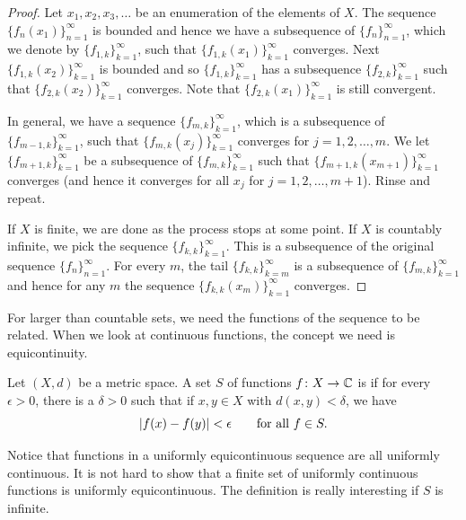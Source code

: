 \begin{proof}
Let $x_1,x_2,x_3,\ldots$ be an enumeration of the elements of $X$.
The sequence $\{ f_n(x_1) \}_{n=1}^\infty$ is bounded and hence
we have a subsequence of $\{ f_n \}_{n=1}^{\infty}$, which we denote by
$\{ f_{1,k} \}_{k=1}^\infty$,
such that
$\{ f_{1,k}(x_1) \}_{k=1}^\infty$ converges.
Next $\{ f_{1,k}(x_2) \}_{k=1}^\infty$ is bounded and so 
$\{ f_{1,k} \}_{k=1}^\infty$ has a subsequence
$\{ f_{2,k} \}_{k=1}^\infty$ such that
$\{ f_{2,k}(x_2) \}_{k=1}^\infty$ converges.  Note that
$\{ f_{2,k}(x_1) \}_{k=1}^\infty$ is still convergent.

In general, we have a sequence $\{ f_{m,k} \}_{k=1}^\infty$,
which is a subsequence of $\{ f_{m-1,k} \}_{k=1}^\infty$,
such that $\{ f_{m,k}(x_j) \}_{k=1}^\infty$ converges for $j=1,2,\ldots, m$.
We let $\{ f_{m+1,k} \}_{k=1}^\infty$ be a subsequence of
$\{ f_{m,k} \}_{k=1}^\infty$
such that
$\{ f_{m+1,k}(x_{m+1}) \}_{k=1}^\infty$ converges (and hence it converges for all
$x_j$ for $j=1,2,\ldots,m+1$).  Rinse and repeat.

If $X$ is finite, we are done as the process stops at some point.
If $X$ is countably infinite,
we pick the sequence
$\{ f_{k,k} \}_{k=1}^\infty$.
This is a subsequence of the original sequence $\{ f_n \}_{n=1}^\infty$.
For every $m$, the tail $\{ f_{k,k} \}_{k=m}^\infty$ is a subsequence of
$\{ f_{m,k} \}_{k=1}^\infty$
and hence for any $m$ the sequence $\{ f_{k,k}(x_m) \}_{k=1}^\infty$ converges.
\end{proof}

For larger than countable sets,
we need the functions of the sequence to be related.  When we look at
continuous functions, the concept we need is equicontinuity.

\begin{defn}
Let $(X,d)$ be a metric space.
A set $S$ of functions
$f \colon X \to {\mathbb{C}}$ is 
\emph{}
if for every $\epsilon > 0$, there is a $\delta > 0$
such that if $x,y \in X$ with $d(x,y) < \delta$, we have
\begin{equation*}
\lvert {f(x)-f(y)} \rvert < \epsilon \qquad \text{for all } f \in S .
\end{equation*}
\end{defn}

Notice that functions in a uniformly equicontinuous sequence are
all uniformly continuous.  It is 
not hard to show that a finite set of uniformly continuous functions
is uniformly equicontinuous.  The definition is really interesting
if $S$ is infinite.

